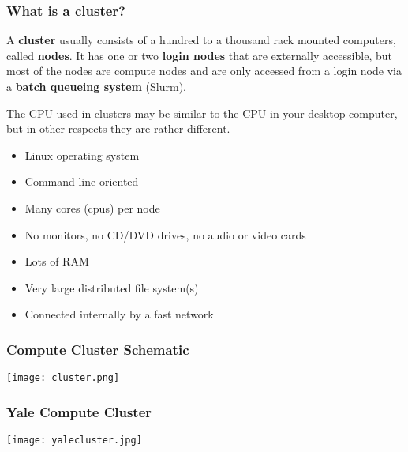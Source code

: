 \documentclass[10pt]{beamer}
\begin{document}
\begin{frame}
\frametitle{What is a cluster?}

A \textbf{cluster} usually consists of a hundred to a thousand rack mounted
computers, called \textbf{nodes}.  It has one or two \textbf{login nodes}
that are externally accessible, but most of the nodes are
compute nodes and are only accessed from a login node via a
\textbf{batch queueing system} (Slurm).

\vskip10pt
The CPU used in clusters may be similar to the CPU in your
desktop computer, but in other respects they are rather different.

\begin{itemize}
\item Linux operating system
\item Command line oriented 
\item Many cores (cpus) per node
\item No monitors, no CD/DVD drives, no audio or video cards
\item Lots of RAM
\item Very large distributed file system(s)
\item Connected internally by a fast network
\end{itemize}
\end{frame}

\begin{frame}[fragile]
\frametitle{Compute Cluster Schematic}
\begin{center} 
\texttt{[image: cluster.png]} 
\end{center}
\end{frame}

\begin{frame}[fragile]
\frametitle{Yale Compute Cluster}

\begin{center}
\texttt{[image: yalecluster.jpg]}
\end{center}

\end{frame}
\end{document}

